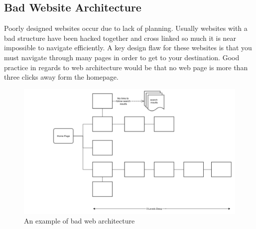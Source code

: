 \documentclass[a4paper, 12pt]{report}
\begin{document}
\subsection{Bad Website Architecture}
Poorly designed websites occur due to lack of planning. Usually websites with a bad structure have been hacked together and cross linked so much it is near impossible to navigate efficiently. A key design flaw for these websites is that you must navigate through many pages in order to get to your destination. Good practice in regards to web architecture would be that no web page is more than three clicks away form the homepage.
\begin{figure}[!htbp]
  \centering
    \includegraphics[width=1.0\textwidth]{bad_web_arch.png}
    \caption{An example of bad web architecture}
    \label{fig:bad_web_arch}
\end{figure}\\
\end{document}
